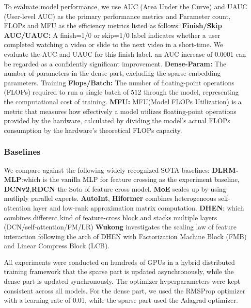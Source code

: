 To evaluate model performance, we use AUC (Area Under the Curve) and UAUC (User-level AUC) as the primary performance metrics and Parameter count, FLOPs and MFU as the efficiency metrics listed as follows: \textbf{Finish/Skip AUC/UAUC:} A finish=1/0 or skip=1/0 label indicates whether a user completed watching a video or slide to the next video in a short-time. We evaluate the AUC and UAUC for this finish label. an AUC increase of 0.0001 can be regarded as a confidently significant improvement. \textbf{Dense-Param:} The number of parameters in the dense part, excluding the sparse embedding parameters.  Training \textbf{Flops/Batch:} The number of floating-point operations (FLOPs) required to run a single batch of 512 through the model, representing the computational cost of training.  \textbf{MFU:} MFU(Model FLOPs Utilization) is a metric that measures how effectively a model utilizes floating-point operations provided by the hardware, calculated by dividing the model’s actual FLOPs consumption by the hardware’s theoretical FLOPs capacity.



\subsubsection{Baselines}

We compare against the following widely recognized SOTA baselines: \textbf{DLRM-MLP}:which is the vanilla MLP for feature crossing as the experiment baseline, \textbf{DCNv2}\cite{wang2021dcn},\textbf{RDCN}\cite{DBLP:conf/kdd/BorisyukZSZTPDH24} the Sota of feature cross model. \textbf{MoE} scales up by using mutliply parallel experts. \textbf{AutoInt}\cite{song2019autoint}, \textbf{Hiformer}\cite{gui2023hiformer} combines heterogeneous self-attention layer and low-rank approximation matrix computation. \textbf{DHEN}\cite{zhang2022dhen}: which combines different kind of feature-cross block and stacks multiple layers (DCN/self-attention/FM/LR) \textbf{Wukong}\cite{zhangwukong} investigates the scaling law of feature interaction following the arch of DHEN with Factorization Machine Block (FMB) and Linear Compress Block (LCB).

All experiments were conducted on hundreds of GPUs in a hybrid distributed training framework that the sparse part is updated asynchronously, while the dense part is updated synchronously. The optimizer hyperparameters were kept consistent across all models. For the dense part, we used the RMSProp optimizer with a learning rate of 0.01, while the sparse part used the Adagrad optimizer. 

